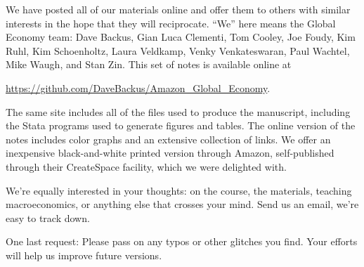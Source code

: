 We have posted all of our materials online
and offer them to others with similar interests in the hope
that they will reciprocate.
``We'' here means the Global Economy team:
Dave Backus, Gian Luca Clementi, Tom Cooley, Joe Foudy, Kim Ruhl, Kim Schoenholtz,
Laura Veldkamp, Venky Venkateswaran, Paul Wachtel, Mike Waugh, and Stan Zin.
This set of notes is available online
at

\vspace*{\parskip}
\centerline{\url{https://github.com/DaveBackus/Amazon_Global_Economy}.}

The same site includes all of the files used to produce the manuscript,
including the Stata programs used to generate figures and tables.
The online version of the notes includes color graphs
and an extensive collection of links.
We offer an inexpensive black-and-white printed version through Amazon,
self-published through their CreateSpace facility,
which we were delighted with.

We're equally interested in your thoughts:  on the course,
the materials, teaching macroeconomics, or anything else that crosses
your mind.
Send us an email, we're easy to track down.

One last request:  Please pass on any typos or other glitches you find.
Your efforts will help us improve future versions.

